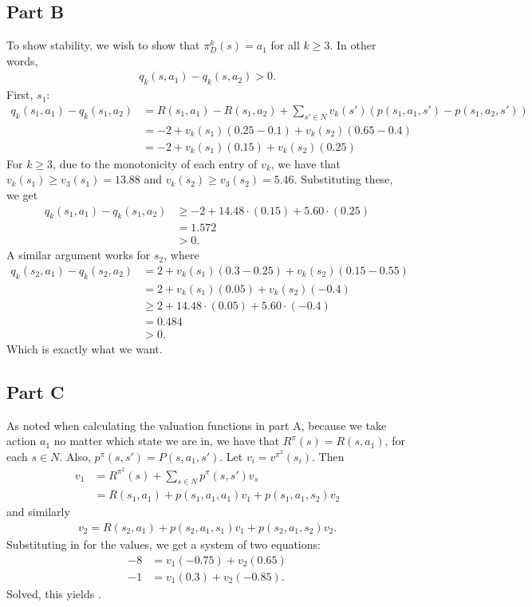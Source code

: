 \documentclass{article}
\begin{document}
\subsection*{Part B}
To show stability, we wish to show that $\pi_D^k(s) = a_1$ for all $k \geq 3$. In other words,
\begin{align*}
	q_k(s, a_1) - q_k(s, a_2) > 0.
\end{align*}
First, $s_1$:
\begin{align*}
	q_k(s_1, a_1) - q_k(s_1, a_2) &= R(s_1, a_1) - R(s_1, a_2) + \sum_{s'\in N}v_k(s')(p(s_1, a_1, s') - p(s_1, a_2, s'))\\
	&= -2 + v_k(s_1)(0.25 - 0.1) + v_k(s_2)(0.65 - 0.4)\\
	&= -2 + v_k(s_1)(0.15) + v_k(s_2)(0.25)
\end{align*}
For $k\geq 3$, due to the monotonicity of each entry of $v_k$, we have that $v_k(s_1) \geq v_3(s_1) = 13.88$ and $v_k(s_2) \geq v_3(s_2) = 5.46$. Substituting these, we get
\begin{align*}
	q_k(s_1, a_1) - q_k(s_1, a_2) &\geq -2 + 14.48\cdot(0.15) + 5.60\cdot(0.25)\\
	&= 1.572\\
	&>0.
\end{align*}
A similar argument works for $s_2$, where
\begin{align*}
	q_k(s_2, a_1) - q_k(s_2, a_2) &= 2 + v_k(s_1)(0.3 - 0.25) + v_k(s_2)(0.15 - 0.55)\\
	&= 2 + v_k(s_1)(0.05) + v_k(s_2)(-0.4)\\
	&\geq 2 + 14.48\cdot(0.05) + 5.60\cdot(-0.4)\\
	&= 0.484\\
	&>0.
\end{align*}
Which is exactly what we want.
\subsection*{Part C}
As noted when calculating the valuation functions in part A, because we take action $a_1$ no matter which state we are in, we have that $R^\pi(s) = R(s, a_1)$, for each $s\in N$. Also, $p^\pi(s, s') = P(s, a_1, s')$. Let $v_i = v^{\pi^2}(s_i)$. Then
\begin{align*}
	v_1 &= R^{\pi^2}(s) + \sum_{s\in N}p^\pi(s, s')v_s\\
	&= R(s_1, a_1) + p(s_1, a_1, a_1)v_1 + p(s_1, a_1, s_2)v_2
\end{align*}
and similarly
\begin{align*}
	v_2 = R(s_2, a_1) + p(s_2, a_1, s_1)v_1 + p(s_2, a_1, s_2)v_2.
\end{align*}
Substituting in for the values, we get a system of two equations:
\begin{align*}
	-8 &= v_1(-0.75) + v_2(0.65)\tag{1}\\
	-1 &= v_1(0.3) + v_2(-0.85).\tag{2}
\end{align*}
Solved, this yields .
\end{document}
